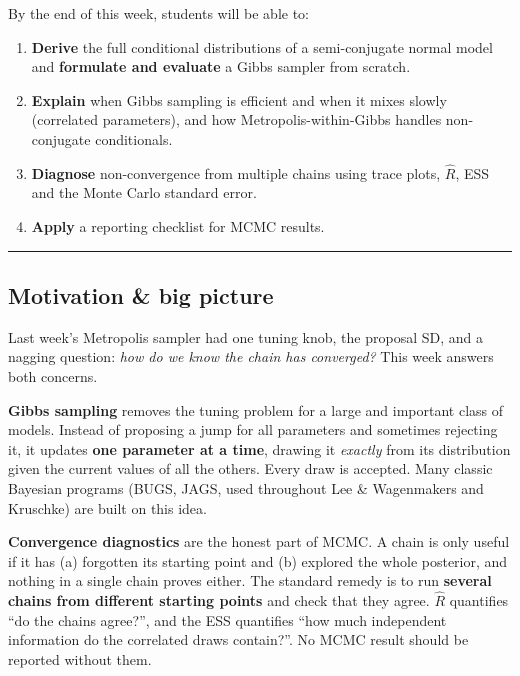 By the end of this week, students will be able to:

\begin{enumerate}
\def\labelenumi{\arabic{enumi}.}
\tightlist
\item
  \textbf{Derive} the full conditional distributions of a semi-conjugate
  normal model and \textbf{formulate and evaluate} a Gibbs sampler from scratch.
\item
  \textbf{Explain} when Gibbs sampling is efficient and when it mixes
  slowly (correlated parameters), and how Metropolis-within-Gibbs
  handles non-conjugate conditionals.
\item
  \textbf{Diagnose} non-convergence from multiple chains using trace
  plots, \(\hat R\), ESS and the Monte Carlo standard error.
\item
  \textbf{Apply} a reporting checklist for MCMC results.
\end{enumerate}

\begin{center}\rule{0.5\linewidth}{0.5pt}\end{center}

\subsection{Motivation \& big picture}

Last week's Metropolis sampler had one tuning knob, the proposal SD, and
a nagging question: \emph{how do we know the chain has converged?} This
week answers both concerns.

\textbf{Gibbs sampling} removes the tuning problem for a large and
important class of models. Instead of proposing a jump for all
parameters and sometimes rejecting it, it updates \textbf{one parameter
at a time}, drawing it \emph{exactly} from its distribution given the
current values of all the others. Every draw is accepted. Many classic
Bayesian programs (BUGS, JAGS, used throughout Lee \& Wagenmakers and
Kruschke) are built on this idea.

\textbf{Convergence diagnostics} are the honest part of MCMC. A chain is
only useful if it has (a) forgotten its starting point and (b) explored
the whole posterior, and nothing in a single chain proves either. The
standard remedy is to run \textbf{several chains from different starting
points} and check that they agree. \(\hat R\) quantifies ``do the chains
agree?'', and the ESS quantifies ``how much independent information do
the correlated draws contain?''. No MCMC result should be reported
without them.


